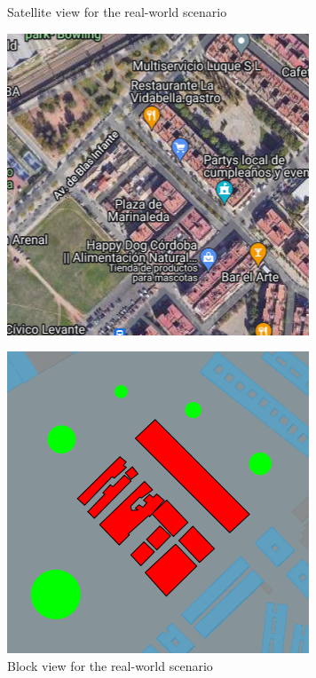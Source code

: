 \documentclass[a4paper,  review, authoryear, 1p.]{elsarticle}
\begin{document}
{		\begin{figure}
			\centering
			\begin{minipage}{0.3\linewidth}
				\centering
				\caption{Satellite view for the real-world scenario}
				\includegraphics[width=1\linewidth]{figures/example_satellite}
				\label{fig:realworld1}
			\end{minipage}
			\begin{minipage}{0.3\linewidth}
				\centering
				\caption{Block view for the real-world scenario}
				\includegraphics[width=1\linewidth]{figures/example_block}

\end{minipage}
\end{figure}}
\end{document}
